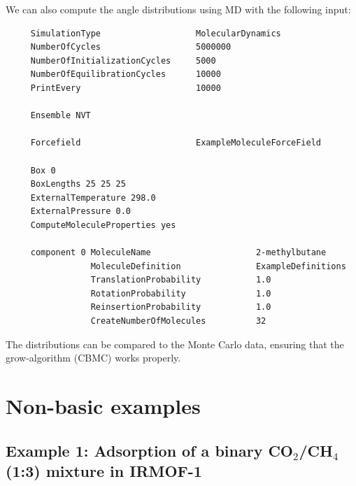We can also compute the angle distributions using MD with the following input:
\begin{tiny}
\begin{verbatim}
     SimulationType                   MolecularDynamics
     NumberOfCycles                   5000000
     NumberOfInitializationCycles     5000
     NumberOfEquilibrationCycles      10000
     PrintEvery                       10000
     
     Ensemble NVT
     
     Forcefield                       ExampleMoleculeForceField
     
     Box 0
     BoxLengths 25 25 25
     ExternalTemperature 298.0
     ExternalPressure 0.0
     ComputeMoleculeProperties yes
     
     component 0 MoleculeName                     2-methylbutane
                 MoleculeDefinition               ExampleDefinitions
                 TranslationProbability           1.0
                 RotationProbability              1.0
                 ReinsertionProbability           1.0
                 CreateNumberOfMolecules          32
\end{verbatim}
\end{tiny}
The distributions can be compared to the Monte Carlo data, ensuring that the grow-algorithm (CBMC) works properly.

\section{Non-basic examples}
\subsection*{Example 1: Adsorption of a binary CO$_2$/CH$_4$ (1:3) mixture in IRMOF-1}

